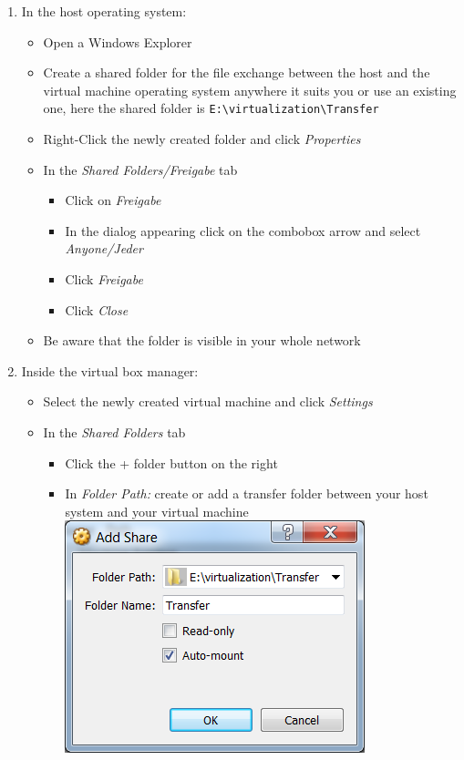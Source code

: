 \begin{enumerate}[noitemsep]
  \item In the host operating system:
    \begin{itemize}
     \item Open a Windows Explorer
     \item Create a shared folder for the file exchange between the host and the virtual machine operating system anywhere it suits you or use an existing one, here the shared folder is \verb+E:\virtualization\Transfer+
     \item Right-Click the newly created folder and click \textit{Properties}
     \item In the \textit{Shared Folders/Freigabe} tab
      \begin{itemize}
	\item Click on \textit{Freigabe}
	\item In the dialog appearing click on the combobox arrow and select \textit{Anyone/Jeder}
	\item Click \textit{Freigabe}
	\item Click \textit{Close}
      \end{itemize}
      \item Be aware that the folder is visible in your whole network
    \end{itemize}
  \item Inside the virtual box manager:
    \begin{itemize}
      \item Select the newly created virtual machine and click \textit{Settings}
      \item In the \textit{Shared Folders} tab
      \begin{itemize}
	\item Click the + folder button on the right
	\item In \textit{Folder Path:} create or add a transfer folder between your host system and your virtual machine\\
	\includegraphics[scale=\screenshotscalefac]{Figures/VirtualBox_VirtualMachine_Settings_SharedFolders_Add}

\end{itemize}
\end{itemize}
\end{enumerate}
